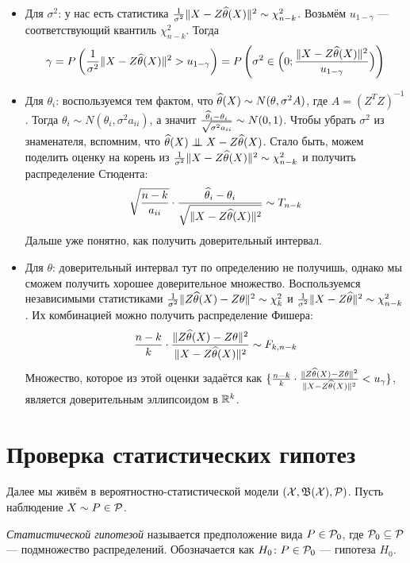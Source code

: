 \begin{itemize}
	\item Для $\sigma^2$: у нас есть статистика $\frac{1}{\sigma^2}\|X - Z\widehat{\theta}(X)\|^2 \sim \chi_{n - k}^2$. Возьмём $u_{1 - \gamma}$ --- соответствующий квантиль $\chi_{n - k}^2$. Тогда
	\[
		\gamma = P\left(\frac{1}{\sigma^2}\|X - Z\widehat{\theta}(X)\|^2 > u_{1 - \gamma}\right) = P\left(\sigma^2 \in \Big(0; \frac{\|X - Z\widehat{\theta}(X)\|^2}{u_{1 - \gamma}}\Big)\right)
	\]
	
	\item Для $\theta_i$: воспользуемся тем фактом, что $\widehat{\theta}(X) \sim N(\theta, \sigma^2A)$, где $A = (Z^TZ)^{-1}$. Тогда $\theta_i \sim N(\theta_i, \sigma^2a_{ii})$, а значит $\frac{\widehat{\theta}_i - \theta_i}{\sqrt{\sigma^2a_{ii}}} \sim N(0, 1)$. Чтобы убрать $\sigma^2$ из знаменателя, вспомним, что $\widehat{\theta}(X) \perp\mkern-9.5mu\perp X - Z\widehat{\theta}(X)$. Стало быть, можем поделить оценку на корень из $\frac{1}{\sigma^2}\|X - Z\widehat{\theta}(X)\|^2 \sim \chi_{n - k}^2$ и получить распределение Стюдента:
	\[
		\sqrt{\frac{n - k}{a_{ii}}} \cdot \frac{\widehat{\theta}_i - \theta_i}{\sqrt{\|X - Z\widehat{\theta}(X)\|^2}} \sim T_{n - k}
	\]
	Дальше уже понятно, как получить доверительный интервал.
	
	\item Для $\theta$: доверительный интервал тут по определению не получишь, однако мы сможем получить хорошее доверительное множество. Воспользуемся независимыми статистиками $\frac{1}{\sigma^2}\|Z\widehat{\theta}(X) - Z\theta\|^2 \sim \chi_k^2$ и $\frac{1}{\sigma^2}\|X - Z\widehat{\theta}\|^2 \sim \chi_{n - k}^2$. Их комбинацией можно получить распределение Фишера:
	\[
		\frac{n - k}{k} \cdot \frac{\|Z\widehat{\theta}(X) - Z\theta\|^2}{\|X - Z\widehat{\theta}(X)\|^2} \sim F_{k, n - k}
	\]
	Множество, которое из этой оценки задаётся как $\{\frac{n - k}{k} \cdot \frac{\|Z\widehat{\theta}(X) - Z\theta\|^2}{\|X - Z\widehat{\theta}(X)\|^2} < u_\gamma\}$, является доверительным эллипсоидом в $\mathbb{R}^k$.
\end{itemize}

\section{Проверка статистических гипотез}

\begin{note}
	Далее мы живём в вероятностно-статистической модели $(\mathcal{X}, \mathfrak{B}(\mathcal{X}), \mathcal{P})$. Пусть наблюдение $X \sim P \in \mathcal{P}$.
\end{note}

\begin{definition}
	\textit{Статистической гипотезой} называется предположение вида $P \in \mathcal{P}_0$, где $\mathcal{P}_0 \subseteq \mathcal{P}$ --- подмножество распределений. Обозначается как $H_0 \colon P \in \mathcal{P}_0$ --- гипотеза $H_0$.
\end{definition}

